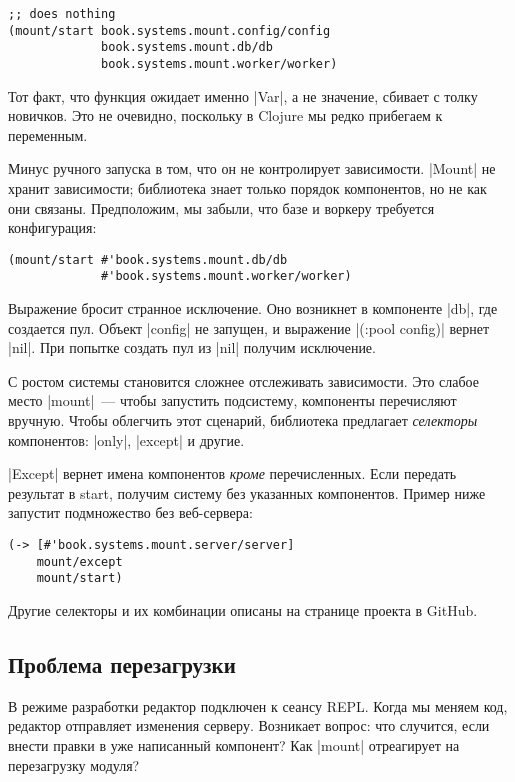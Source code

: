 \begin{verbatim}
;; does nothing
(mount/start book.systems.mount.config/config
             book.systems.mount.db/db
             book.systems.mount.worker/worker)
\end{verbatim}

Тот факт, что функция ожидает именно \spverb|Var|, а не значение, сбивает с
толку новичков. Это не очевидно, поскольку в Clojure мы редко прибегаем к
переменным.

Минус ручного запуска в том, что он не контролирует зависимости. \spverb|Mount|
не хранит зависимости; библиотека знает только порядок компонентов, но не как
они связаны. Предположим, мы забыли, что базе и воркеру требуется конфигурация:

\begin{verbatim}
(mount/start #'book.systems.mount.db/db
             #'book.systems.mount.worker/worker)
\end{verbatim}

Выражение бросит странное исключение. Оно возникнет в компоненте \spverb|db|,
где создается пул. Объект \spverb|config| не запущен, и выражение
\spverb|(:pool config)| вернет \spverb|nil|. При попытке создать пул из \spverb|nil| получим
исключение.

С ростом системы становится сложнее отслеживать зависимости. Это слабое место
\spverb|mount|~--- чтобы запустить подсистему, компоненты перечисляют
вручную. Чтобы облегчить этот сценарий, библиотека предлагает \emph{селекторы}
компонентов: \spverb|only|, \spverb|except| и другие.

\spverb|Except| вернет имена компонентов \emph{кроме} перечисленных. Если
передать результат в start, получим систему без указанных компонентов. Пример
ниже запустит подмножество без веб-сервера:

\begin{verbatim}
(-> [#'book.systems.mount.server/server]
    mount/except
    mount/start)
\end{verbatim}

Другие селекторы и их комбинации описаны на странице проекта в GitHub.

\subsection{Проблема перезагрузки}

В режиме разработки редактор подключен к сеансу REPL. Когда мы меняем код,
редактор отправляет изменения серверу. Возникает вопрос: что случится, если
внести правки в уже написанный компонент? Как \spverb|mount| отреагирует на
перезагрузку модуля?

